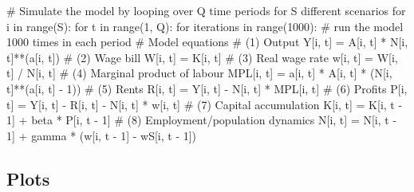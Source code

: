 \documentclass[
  letterpaper,
  DIV=11,
  numbers=noendperiod]{scrreprt}
\newenvironment{Shaded}{\begin{snugshade}}{\end{snugshade}}
\newcommand{\BuiltInTok}[1]{\textcolor[rgb]{0.00,0.23,0.31}{#1}}
\newcommand{\CommentTok}[1]{\textcolor[rgb]{0.37,0.37,0.37}{#1}}
\newcommand{\ControlFlowTok}[1]{\textcolor[rgb]{0.00,0.23,0.31}{#1}}
\newcommand{\DecValTok}[1]{\textcolor[rgb]{0.68,0.00,0.00}{#1}}
\newcommand{\KeywordTok}[1]{\textcolor[rgb]{0.00,0.23,0.31}{#1}}
\newcommand{\NormalTok}[1]{\textcolor[rgb]{0.00,0.23,0.31}{#1}}
\newcommand{\OperatorTok}[1]{\textcolor[rgb]{0.37,0.37,0.37}{#1}}
\begin{document}
\begin{tcolorbox}
\begin{Shaded}
\begin{Highlighting}[]
\CommentTok{\# Simulate the model by looping over Q time periods for S different scenarios}
\ControlFlowTok{for}\NormalTok{ i }\KeywordTok{in} \BuiltInTok{range}\NormalTok{(S):}
    \ControlFlowTok{for}\NormalTok{ t }\KeywordTok{in} \BuiltInTok{range}\NormalTok{(}\DecValTok{1}\NormalTok{, Q):}
        \ControlFlowTok{for}\NormalTok{ iterations }\KeywordTok{in} \BuiltInTok{range}\NormalTok{(}\DecValTok{1000}\NormalTok{):  }\CommentTok{\# run the model 1000 times in each period}
            \CommentTok{\# Model equations}
            \CommentTok{\# (1) Output}
\NormalTok{            Y[i, t] }\OperatorTok{=}\NormalTok{ A[i, t] }\OperatorTok{*}\NormalTok{ N[i, t]}\OperatorTok{**}\NormalTok{(a[i, t])}
            \CommentTok{\# (2) Wage bill}
\NormalTok{            W[i, t] }\OperatorTok{=}\NormalTok{ K[i, t]}
            \CommentTok{\# (3) Real wage rate}
\NormalTok{            w[i, t] }\OperatorTok{=}\NormalTok{ W[i, t] }\OperatorTok{/}\NormalTok{ N[i, t]}
            \CommentTok{\# (4) Marginal product of labour}
\NormalTok{            MPL[i, t] }\OperatorTok{=}\NormalTok{ a[i, t] }\OperatorTok{*}\NormalTok{ A[i, t] }\OperatorTok{*}\NormalTok{ (N[i, t]}\OperatorTok{**}\NormalTok{(a[i, t] }\OperatorTok{{-}} \DecValTok{1}\NormalTok{))}
            \CommentTok{\# (5) Rents}
\NormalTok{            R[i, t] }\OperatorTok{=}\NormalTok{ Y[i, t] }\OperatorTok{{-}}\NormalTok{ N[i, t] }\OperatorTok{*}\NormalTok{ MPL[i, t]}
            \CommentTok{\# (6) Profits}
\NormalTok{            P[i, t] }\OperatorTok{=}\NormalTok{ Y[i, t] }\OperatorTok{{-}}\NormalTok{ R[i, t] }\OperatorTok{{-}}\NormalTok{ N[i, t] }\OperatorTok{*}\NormalTok{ w[i, t]}
            \CommentTok{\# (7) Capital accumulation}
\NormalTok{            K[i, t] }\OperatorTok{=}\NormalTok{ K[i, t }\OperatorTok{{-}} \DecValTok{1}\NormalTok{] }\OperatorTok{+}\NormalTok{ beta }\OperatorTok{*}\NormalTok{ P[i, t }\OperatorTok{{-}} \DecValTok{1}\NormalTok{]}
            \CommentTok{\# (8) Employment/population dynamics}
\NormalTok{            N[i, t] }\OperatorTok{=}\NormalTok{ N[i, t }\OperatorTok{{-}} \DecValTok{1}\NormalTok{] }\OperatorTok{+}\NormalTok{ gamma }\OperatorTok{*}\NormalTok{ (w[i, t }\OperatorTok{{-}} \DecValTok{1}\NormalTok{] }\OperatorTok{{-}}\NormalTok{ wS[i, t }\OperatorTok{{-}} \DecValTok{1}\NormalTok{])}
\end{Highlighting}
\end{Shaded}

\end{tcolorbox}

\subsection{Plots}\label{plots-10}
\end{document}
